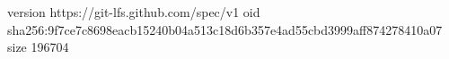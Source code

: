 version https://git-lfs.github.com/spec/v1
oid sha256:9f7ce7c8698eacb15240b04a513c18d6b357e4ad55cbd3999aff874278410a07
size 196704
